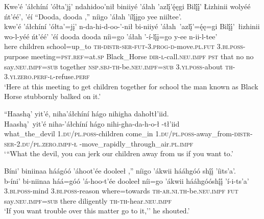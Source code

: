 \ea\label{ex:text3-3-1}
Kwe’é ’áłchíní ’ółta’jį’ ndahidoo’nił biniiyé ’áłah ’azlį́’ę́ęgi Bilį́į́’ Łizhinii wolyéé ńt’éé’, ’éí ``Dooda, dooda ,'' níigo ’áłah ’ílį́įgo yee niiltee’.\\
\gll kwe’é	’áłchíní	’ółta’=jį’	n-da-hi-d-oo-’-nił	bi-niiyé	’áłah~{’azlį́’=ę́ę=gi}	Bilį́į́’~{łizhinii}	wo-l-yéé	ńt’éé’	’éí	dooda	dooda	níi=go	’áłah ’-í-lį́į=go	y-ee	n-ii-l-tee’\\
     here	children	school=up\_to	\textsc{th}-\textsc{distr}-\textsc{ser}-\textsc{fut}-3.\textsc{prog}-\textsc{d}-move.\textsc{pl}.\textsc{fut}	3.\textsc{bi}.\textsc{poss}-purpose	meeting=\textsc{pst}.\textsc{ref}=at.\textsc{sp}	Black\_Horse	\textsc{dir}-\textsc{l}-call.\textsc{neu}.\textsc{impf}	\textsc{pst}	that	no	no	say.\textsc{neu}.\textsc{impf}=\textsc{sub}	together \textsc{nsp}.\textsc{sbj}-\textsc{th}-be.\textsc{neu}.\textsc{impf}=\textsc{sub}	3.\textsc{yi}.\textsc{poss}-about	\textsc{th}-3.\textsc{yi}.\textsc{zero}.\textsc{perf}-\textsc{l}-refuse.\textsc{perf}\\
\glt `Here at this meeting to get children together for school the man known as Black Horse stubbornly balked on it.'
\z

\ea\label{ex:text3-3-2}
``Haashą’ yit’é, niha’áłchíní hágo nihigha dahołtł’iid.\\
\gll Haashą’~{yit’é}	niha-’áłchíní	hágo	nihi-gha-da-h-o-ł -tł’iid\\
     what\_the\_devil	1.\textsc{du}/\textsc{pl}.\textsc{poss}-children	come\_in	1.\textsc{du}/\textsc{pl}.\textsc{poss}-away\_from-\textsc{distr}-\textsc{ser}-2.\textsc{du}/\textsc{pl}.\textsc{zero}.\textsc{impf}-\textsc{ł} -move\_rapidly\_through\_air.\textsc{pl}.\textsc{impf}\\
\glt `{``}What the devil, you can jerk our children away from us if you want to.'
\z

\ea\label{ex:text3-3-3}
Bíni’ biniinaa háágóó ’áhoot’ée dooleeł ,'' níigo ’ákwii hááhgóó shį́į́ ’íits’a’.\\
\gll b-íni’	bi-niinaa	háá=góó	’á-hoo-t’ée	dooleeł	níi=go	’ákwii	hááhgóóshį́į́	’í-i-ts’a’\\
     3.\textsc{bi}.\textsc{poss}-mind	3.\textsc{bi}.\textsc{poss}-reason	where=towards	\textsc{th}-\textsc{ar}.\textsc{ni}.\textsc{th}-be.\textsc{neu}.\textsc{impf}	\textsc{fut}	say.\textsc{neu}.\textsc{impf}=\textsc{sub}	there	diligently	\textsc{th}-\textsc{th}-hear.\textsc{neu}.\textsc{impf}\\
\glt `If you want trouble over this matter go to it,'' he shouted.'
\z

